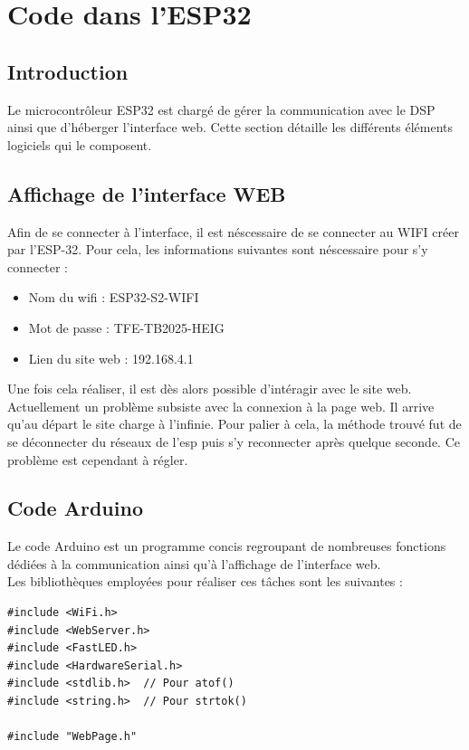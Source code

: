 \chapter{Code dans l'ESP32}
\label{sec:CodeESP32}

\section{Introduction}
Le microcontrôleur ESP32 est chargé de gérer la communication avec le DSP ainsi que d'héberger l'interface web. Cette section détaille les différents éléments logiciels qui le composent.

\section{Affichage de l'interface WEB}
Afin de se connecter à l'interface, il est néscessaire de se connecter au WIFI créer par l'ESP-32. Pour cela, les informations suivantes sont néscessaire pour s'y connecter :

\begin{itemize}
  \item Nom du wifi : ESP32-S2-WIFI
  \item Mot de passe : TFE-TB2025-HEIG
  \item Lien du site web : 192.168.4.1
\end{itemize}

Une fois cela réaliser, il est dès alors possible d'intéragir avec le site web.\\

Actuellement un problème subsiste avec la connexion à la page web. Il arrive qu'au départ le site charge à l'infinie. Pour palier à cela, la méthode trouvé fut de se déconnecter du réseaux de l'esp puis s'y reconnecter après quelque seconde. Ce problème est cependant à régler.

\section{Code Arduino}
Le code Arduino est un programme concis regroupant de nombreuses fonctions dédiées à la communication ainsi qu'à l'affichage de l'interface web.\\

Les bibliothèques employées pour réaliser ces tâches sont les suivantes :

\begin{verbatim}
#include <WiFi.h>
#include <WebServer.h>
#include <FastLED.h>
#include <HardwareSerial.h>
#include <stdlib.h>  // Pour atof()
#include <string.h>  // Pour strtok()

#include "WebPage.h"
\end{verbatim}

